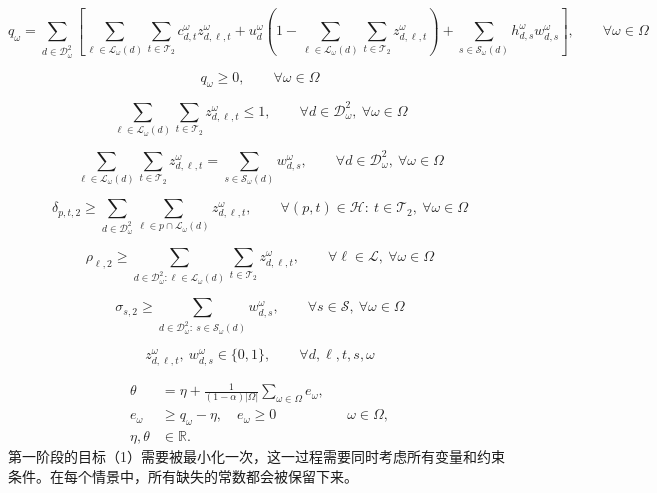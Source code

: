 \documentclass{article}
\begin{document}
\begin{equation}
q_\omega
=
\sum_{d\in \mathcal{D}^2_\omega}
\left[
\sum_{\ell\in \mathcal{L}_\omega(d)} \sum_{t\in \mathcal{T}_2} c^\omega_{d,t} z^\omega_{d,\ell,t}
+ u^\omega_d \left(1 - \sum_{\ell\in \mathcal{L}_\omega(d)} \sum_{t\in \mathcal{T}_2} z^\omega_{d,\ell,t}\right)
+ \sum_{s\in \mathcal{S}_\omega(d)} h^\omega_{d,s} w^\omega_{d,s}
\right],
\qquad \forall \omega \in \Omega
\tag{12}
\end{equation}

\begin{equation}
q_\omega \ge 0,
\qquad \forall \omega \in \Omega
\tag{12a}
\end{equation}

\begin{equation}
\sum_{\ell\in \mathcal{L}_\omega(d)} \sum_{t\in \mathcal{T}_2} z^\omega_{d,\ell,t} \le 1,
\qquad \forall d \in \mathcal{D}^2_\omega,\ \forall \omega \in \Omega
\tag{13}
\end{equation}

\begin{equation}
\sum_{\ell\in \mathcal{L}_\omega(d)} \sum_{t\in \mathcal{T}_2} z^\omega_{d,\ell,t}
=
\sum_{s\in \mathcal{S}_\omega(d)} w^\omega_{d,s},
\qquad \forall d \in \mathcal{D}^2_\omega,\ \forall \omega \in \Omega
\tag{14}
\end{equation}

\begin{equation}
\delta_{p,t,2}
\ge
\sum_{d\in \mathcal{D}^2_\omega} \sum_{\ell\in p \cap \mathcal{L}_\omega(d)} z^\omega_{d,\ell,t},
\qquad \forall (p,t) \in \mathcal{H}:\ t \in \mathcal{T}_2,\ \forall \omega \in \Omega
\tag{15}
\end{equation}

\begin{equation}
\rho_{\ell,2}
\ge
\sum_{d\in \mathcal{D}^2_\omega:\ell\in \mathcal{L}_\omega(d)} \sum_{t\in \mathcal{T}_2} z^\omega_{d,\ell,t},
\qquad \forall \ell \in \mathcal{L},\ \forall \omega \in \Omega
\tag{16}
\end{equation}

\begin{equation}
\sigma_{s,2}
\ge
\sum_{d\in \mathcal{D}^2_\omega:\ s\in \mathcal{S}_\omega(d)} w^\omega_{d,s},
\qquad \forall s \in \mathcal{S},\ \forall \omega \in \Omega
\tag{17}
\end{equation}

\begin{equation}
z^\omega_{d,\ell,t},\ w^\omega_{d,s} \in \{0,1\},
\qquad \forall d,\ell,t,s,\omega
\tag{18}
\end{equation}


\begin{align}
\theta&=\eta+\frac{1}{(1-\alpha)|\Omega|}\sum_{\omega\in\Omega}e_\omega,\tag{19}\\
e_\omega&\ge q_\omega-\eta,\quad e_\omega\ge0 &&\omega\in\Omega,\tag{20}\\
\eta,\theta&\in\mathbb R.\tag{21}
\end{align}
第一阶段的目标（1）需要被最小化一次，这一过程需要同时考虑所有变量和约束条件。在每个情景中，所有缺失的常数都会被保留下来。
\end{document}
